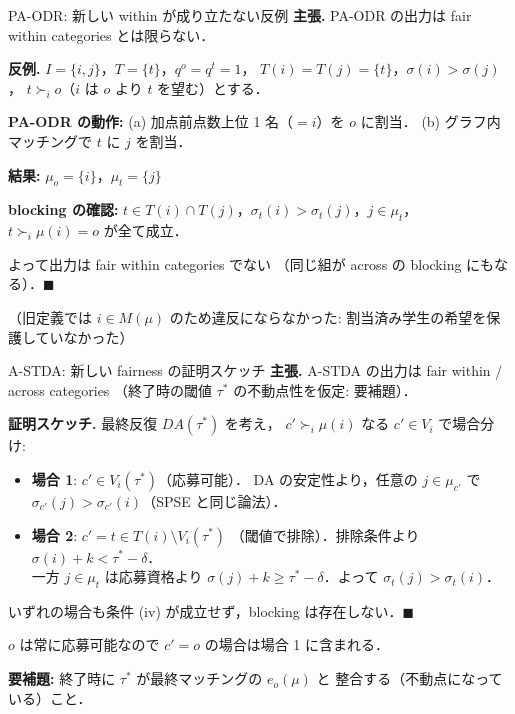 \documentclass[aspectratio=43,11pt]{beamer}
\newcommand{\muc}[1]{\mu_{#1}}
\newcommand{\eo}{e_o}
\newcommand{\score}{\sigma}
\begin{document}
\begin{frame}{PA-ODR: 新しい within が成り立たない反例}
  \textbf{主張.} PA-ODR の出力は fair within categories とは限らない．

  \vspace{0.5em}
  \textbf{反例.} $I = \{i, j\}$，$T = \{t\}$，$q^{o} = q^{t} = 1$，
  $T(i) = T(j) = \{t\}$，$\score(i) > \score(j)$，
  $t \succ_i o$（$i$ は $o$ より $t$ を望む）とする．

  \vspace{0.5em}
  \textbf{PA-ODR の動作:}
  (a) 加点前点数上位 1 名（$= i$）を $o$ に割当．
  (b) グラフ内マッチングで $t$ に $j$ を割当．

  \vspace{0.5em}
  \textbf{結果:} $\muc{o} = \{i\}$，$\muc{t} = \{j\}$

  \vspace{0.5em}
  \textbf{blocking の確認:}
  $t \in T(i) \cap T(j)$，$\score_t(i) > \score_t(j)$，$j \in \muc{t}$，
  $t \succ_i \mu(i) = o$ が全て成立．

  \vspace{0.5em}
  よって出力は fair within categories でない
  （同じ組が across の blocking にもなる）．$\blacksquare$

  \vspace{0.5em}
  （旧定義では $i \in M(\mu)$ のため違反にならなかった:
  割当済み学生の希望を保護していなかった）
\end{frame}

\begin{frame}{A-STDA: 新しい fairness の証明スケッチ}
  \textbf{主張.} A-STDA の出力は fair within / across categories
  （終了時の閾値 $\tau^{*}$ の不動点性を仮定: 要補題）．

  \vspace{0.5em}
  \textbf{証明スケッチ.} 最終反復 $DA(\tau^{*})$ を考え，
  $c' \succ_i \mu(i)$ なる $c' \in V_i$ で場合分け:
  \begin{itemize}
    \item \textbf{場合 1}: $c' \in V_i(\tau^{*})$（応募可能）．
      DA の安定性より，任意の $j \in \muc{c'}$ で
      $\score_{c'}(j) > \score_{c'}(i)$（SPSE と同じ論法）．
    \item \textbf{場合 2}: $c' = t \in T(i) \setminus V_i(\tau^{*})$
      （閾値で排除）．排除条件より $\score(i) + k < \tau^{*} - \delta$．\\
      一方 $j \in \muc{t}$ は応募資格より
      $\score(j) + k \ge \tau^{*} - \delta$．よって
      $\score_t(j) > \score_t(i)$．
  \end{itemize}
  いずれの場合も条件 (iv) が成立せず，blocking は存在しない．$\blacksquare$

  \vspace{0.5em}
  $o$ は常に応募可能なので $c' = o$ の場合は場合 1 に含まれる．

  \vspace{0.5em}
  \textbf{要補題:} 終了時に $\tau^{*}$ が最終マッチングの $\eo(\mu)$ と
  整合する（不動点になっている）こと．
\end{frame}
\end{document}
